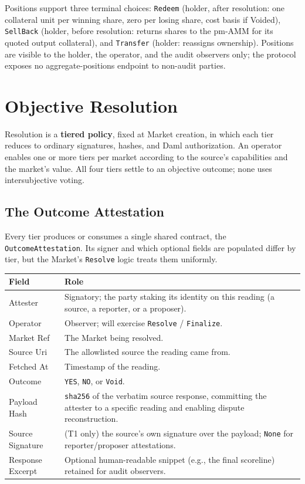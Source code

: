 \documentclass[11pt,a4paper]{article}
\begin{document}
Positions support three terminal choices: \texttt{Redeem} (holder, after resolution: one collateral unit per winning share, zero per losing share, cost basis if Voided), \texttt{SellBack} (holder, before resolution: returns shares to the pm-AMM for its quoted output collateral), and \texttt{Transfer} (holder: reassigns ownership). Positions are visible to the holder, the operator, and the audit observers only; the protocol exposes no aggregate-positions endpoint to non-audit parties.

\section{Objective Resolution}
\label{sec:resolution}

Resolution is a \textbf{tiered policy}, fixed at Market creation, in which each tier reduces to ordinary signatures, hashes, and Daml authorization. An operator enables one or more tiers per market according to the source's capabilities and the market's value. All four tiers settle to an objective outcome; none uses intersubjective voting.

\subsection{The Outcome Attestation}

Every tier produces or consumes a single shared contract, the \texttt{OutcomeAttestation}. Its signer and which optional fields are populated differ by tier, but the Market's \texttt{Resolve} logic treats them uniformly.

\vspace{0.3em}
\begin{center}
\begin{tabular}{p{3.3cm} p{10.7cm}}
\toprule
\textbf{Field} & \textbf{Role} \\
\midrule
Attester & Signatory; the party staking its identity on this reading (a source, a reporter, or a proposer). \\
Operator & Observer; will exercise \texttt{Resolve} / \texttt{Finalize}. \\
Market Ref & The Market being resolved. \\
Source Uri & The allowlisted source the reading came from. \\
Fetched At & Timestamp of the reading. \\
Outcome & \texttt{YES}, \texttt{NO}, or \texttt{Void}. \\
Payload Hash & \texttt{sha256} of the verbatim source response, committing the attester to a specific reading and enabling dispute reconstruction. \\
Source Signature & (T1 only) the source's own signature over the payload; \texttt{None} for reporter/proposer attestations. \\
Response Excerpt & Optional human-readable snippet (e.g., the final scoreline) retained for audit observers. \\
\bottomrule
\end{tabular}
\end{center}
\end{document}
